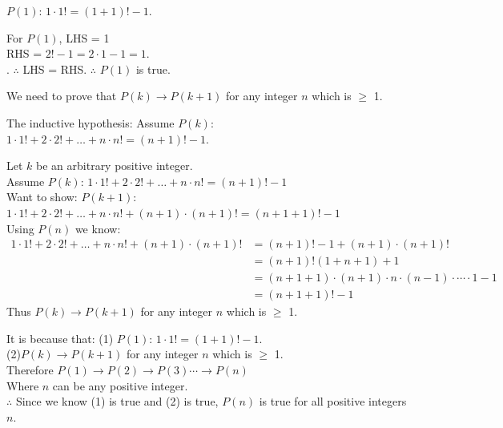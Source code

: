 \documentclass[12pt]{exam}
\begin{document}
\begin{solution}
    \begin{qparts}
        \item $P(1)$: $1 \cdot 1! = (1+1)!  - 1$.
        \item For $P(1)$, LHS =  1\\
                    RHS = $2! - 1 = 2 \cdot 1 - 1 = 1$.\\.
                    $\therefore$ LHS = RHS.
                    $\therefore$ $P(1)$ is true.
        \item We need to prove that $P(k) \rightarrow P(k+1)$ for any integer $n$ which is $\geq$ 1.
        \item The inductive hypothesis: Assume $P(k)$: $1 \cdot 1! + 2 \cdot 2!+\dots+ n \cdot n! = (n + 1)! - 1$.
        \item Let $k$ be an arbitrary positive integer.\\
            Assume $P(k)$: $1 \cdot 1! + 2 \cdot 2!+\dots+ n \cdot n! = (n + 1)! - 1$\\
            Want to show: $P(k+1)$: $1 \cdot 1! + 2 \cdot 2!+\dots+ n \cdot n! + (n+1) \cdot (n+1)! = (n + 1 + 1)! - 1$\\
            Using $P(n)$ we know: 
            \begin{align*}
                1 \cdot 1! + 2 \cdot 2!+\dots+ n \cdot n! + (n+1) \cdot (n+1)! &= (n + 1)! - 1 + (n+1) \cdot (n + 1)! \\
                &= (n+1)! (1 + n + 1) + 1\\
                &= (n + 1 + 1)\cdot (n+1) \cdot n \cdot (n-1) \cdot \cdots \cdot 1 -1\\
                &= (n + 1 + 1)! -1
            \end{align*}
            Thus $P(k) \rightarrow P(k+1)$ for any integer $n$ which is $\geq$ 1.
        \item It is because that: (1) $P(1)$: $1 \cdot 1! = (1+1)!  - 1$.\\
            (2)$P(k) \rightarrow P(k+1)$ for any integer $n$ which is $\geq$ 1.\\
            Therefore $P(1) \rightarrow P(2) \rightarrow P(3) \cdots \rightarrow P(n)$\\
            Where $n$ can be any positive integer.\\
            $\therefore$ Since we know (1) is true and (2) is true, $P(n)$ is true for all positive integers $n$.

    \end{qparts}
\end{solution}
\end{document}
